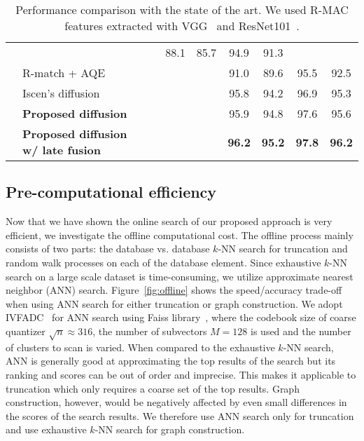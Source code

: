 \documentclass[letterpaper]{article} \usepackage{aaai19}  \usepackage{times}  \usepackage{helvet}  \usepackage{courier}  \usepackage{url}  \usepackage{graphicx}  \frenchspacing  \setlength{\pdfpagewidth}{8.5in}  \setlength{\pdfpageheight}{11in}
\newcommand{\cmark}{\ding{51}}
\begin{document}
\begin{table*}[t]
\begin{center}
\begin{tabular}{@{}l l c c c c c c c@{}}
                                                      &        & \cmark & 88.1 & 85.7 & 94.9 & 91.3 \\
    & R-match + AQE~\cite{chum2007total}            & &        & \cmark & 91.0 & 89.6 & 95.5 & 92.5 \\
    & Iscen's diffusion~\cite{iscen2017efficient}    & & \cmark & \cmark & 95.8 & 94.2 & 96.9 & 95.3\\
    & \textbf{Proposed diffusion}                   & &        & \cmark & 95.9 & 94.8 & 97.6 & 95.6 \\
    & \textbf{Proposed diffusion w/ late fusion}         & & \cmark & \cmark & \textbf{96.2} & \textbf{95.2} & \textbf{97.8} & \textbf{96.2} \\
\bottomrule
\end{tabular}
\end{center}
\caption{Performance comparison with the state of the art. We used R-MAC features extracted with VGG~\cite{radenovic2016cnn} and ResNet101~\cite{gordo2016deep}.}
\label{tab:results}
\vspace{-3mm}
\end{table*}

\subsection{Pre-computational efficiency}

Now that we have shown the online search of our proposed approach is very efficient, we investigate the offline computational cost.
The offline process mainly consists of two parts: the database vs. database $k$-NN search for truncation and random walk processes on each of the database element.
Since exhaustive $k$-NN search on a large scale dataset is time-consuming, we utilize approximate nearest neighbor (ANN) search.
Figure~\ref{fig:offline} shows the speed/accuracy trade-off when using ANN search for either truncation or graph construction.
We adopt IVFADC~\cite{jegou2011product} for ANN search using Faiss library~\cite{johnson2017billion}, where the codebook size of coarse quantizer $\sqrt{n}\approx316$, the number of subvectors $M=128$ is used and the number of clusters to scan is varied.
When compared to the exhaustive $k$-NN search, ANN is generally good at approximating the top results of the search but its ranking and scores can be out of order and imprecise.
This makes it applicable to truncation which only requires a coarse set of the top results.
Graph construction, however, would be negatively affected by even small differences in the scores of the search results.
We therefore use ANN search only for truncation and use exhaustive $k$-NN search for graph construction.
\end{document}
